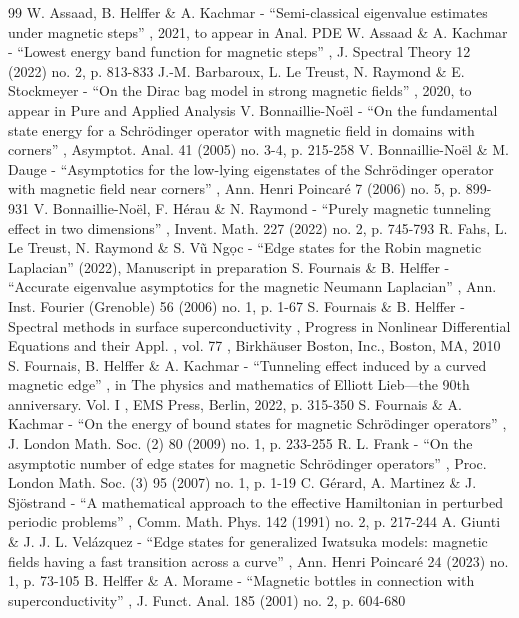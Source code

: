 \documentclass[10pt]{amsart}
\theoremstyle{plain}
\theoremstyle{definition}
\begin{document}
\begin{thebibliography}{99}
 W. Assaad, B. Helffer \& A. Kachmar - “Semi-classical eigenvalue estimates under magnetic steps” , 2021, to appear in Anal. PDE
 W. Assaad \& A. Kachmar - “Lowest energy band function for magnetic steps” , J. Spectral Theory 12 (2022) no. 2, p. 813-833
 J.-M. Barbaroux, L. Le Treust, N. Raymond \& E. Stockmeyer - “On the Dirac bag model in strong magnetic fields” , 2020, to appear in Pure and Applied Analysis
 V. Bonnaillie-Noël - “On the fundamental state energy for a Schrödinger operator with magnetic field in domains with corners” , Asymptot. Anal. 41 (2005) no. 3-4, p. 215-258
 V. Bonnaillie-Noël \& M. Dauge - “Asymptotics for the low-lying eigenstates of the Schrödinger operator with magnetic field near corners” , Ann. Henri Poincaré 7 (2006) no. 5, p. 899-931
 V. Bonnaillie-Noël, F. Hérau \& N. Raymond - “Purely magnetic tunneling effect in two dimensions” , Invent. Math. 227 (2022) no. 2, p. 745-793
 R. Fahs, L. Le Treust, N. Raymond \& S. Vũ Ngọc - “Edge states for the Robin magnetic Laplacian” (2022), Manuscript in preparation
 S. Fournais \& B. Helffer - “Accurate eigenvalue asymptotics for the magnetic Neumann Laplacian” , Ann. Inst. Fourier (Grenoble) 56 (2006) no. 1, p. 1-67
 S. Fournais \& B. Helffer - Spectral methods in surface superconductivity , Progress in Nonlinear Differential Equations and their Appl. , vol. 77 , Birkhäuser Boston, Inc., Boston, MA, 2010
 S. Fournais, B. Helffer \& A. Kachmar - “Tunneling effect induced by a curved magnetic edge” , in The physics and mathematics of Elliott Lieb—the 90th anniversary. Vol. I , EMS Press, Berlin, 2022, p. 315-350
 S. Fournais \& A. Kachmar - “On the energy of bound states for magnetic Schrödinger operators” , J. London Math. Soc. (2) 80 (2009) no. 1, p. 233-255
 R. L. Frank - “On the asymptotic number of edge states for magnetic Schrödinger operators” , Proc. London Math. Soc. (3) 95 (2007) no. 1, p. 1-19
 C. Gérard, A. Martinez \& J. Sjöstrand - “A mathematical approach to the effective Hamiltonian in perturbed periodic problems” , Comm. Math. Phys. 142 (1991) no. 2, p. 217-244
 A. Giunti \& J. J. L. Velázquez - “Edge states for generalized Iwatsuka models: magnetic fields having a fast transition across a curve” , Ann. Henri Poincaré 24 (2023) no. 1, p. 73-105
 B. Helffer \& A. Morame - “Magnetic bottles in connection with superconductivity” , J. Funct. Anal. 185 (2001) no. 2, p. 604-680

\end{thebibliography}
\end{document}
